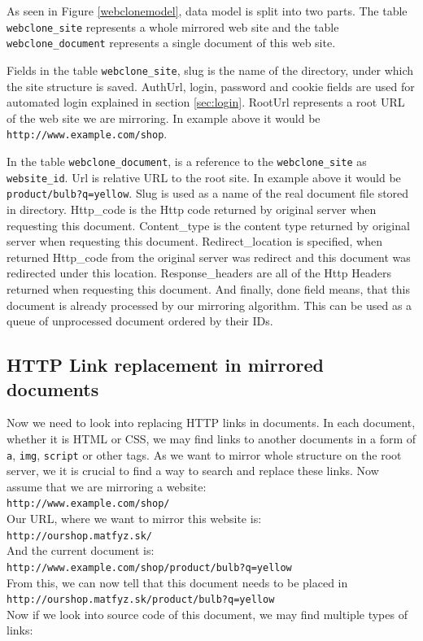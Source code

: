 As seen in Figure \ref{webclonemodel}, data model is split into two parts. The table \texttt{webclone\_site} represents a whole mirrored web site and the table \texttt{webclone\_document} represents a single document of this web site.

Fields in the table \texttt{webclone\_site}, slug is the name of the directory, under which the site structure is saved. AuthUrl, login, password and cookie fields are used for automated login explained in section \ref{sec:login}. RootUrl represents a root URL of the web site we are mirroring. In example above it would be \texttt{http://www.example.com/shop}.

In the table \texttt{webclone\_document}, is a reference to the \texttt{webclone\_site} as \texttt{website\_id}. Url is relative URL to the root site. In example above it would be \texttt{product/bulb?q=yellow}. Slug is used as a name of the real document file stored in directory. Http\_code is the Http code returned by original server when requesting this document. Content\_type is the content type returned by original server when requesting this document. Redirect\_location is specified, when returned Http\_code from the original server was redirect and this document was redirected under this location. Response\_headers are all of the Http Headers returned when requesting this document. And finally, done field means, that this document is already processed by our mirroring algorithm. This can be used as a queue of unprocessed document ordered by their IDs.

\subsection{HTTP Link replacement in mirrored documents}
\label{sec:linkReplace}
Now we need to look into replacing HTTP links in documents. In each document, whether it is HTML or CSS, we may find links to another documents in a form of \texttt{a}, \texttt{img}, \texttt{script} or other tags. As we want to mirror whole structure on the root server, we it is crucial to find a way to search and replace these links.
Now assume that we are mirroring a website: \\
\texttt{http://www.example.com/shop/} \\
Our URL, where  we want to mirror this website is: \\
\texttt{http://ourshop.matfyz.sk/} \\
And the current document is: \\
\texttt{http://www.example.com/shop/product/bulb?q=yellow} \\
From this, we can now tell that this document needs to be placed in \\
\texttt{http://ourshop.matfyz.sk/product/bulb?q=yellow} \\
Now if we look into source code of this document, we may find multiple types of links:

